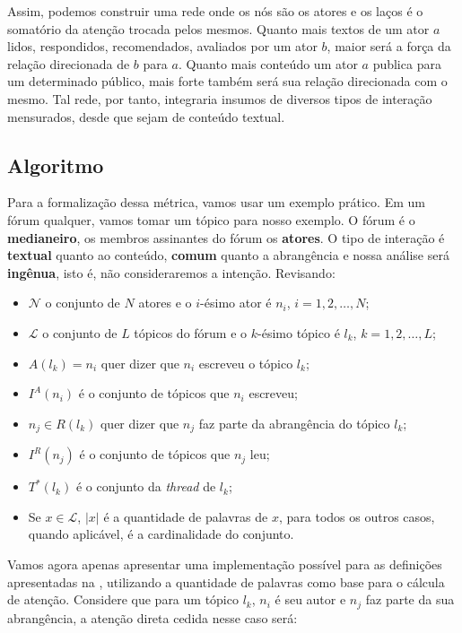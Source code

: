 Assim, podemos construir uma rede onde os nós são os atores e os laços é o
somatório da atenção trocada pelos mesmos. Quanto mais textos de um ator $a$
lidos, respondidos, recomendados, avaliados por um ator $b$, maior será a força
da relação direcionada de $b$ para $a$. Quanto mais conteúdo um ator $a$ publica
para um determinado público, mais forte também será sua relação direcionada
com o mesmo. Tal rede, por tanto, integraria insumos de diversos tipos de
interação mensurados, desde que sejam de conteúdo textual.

\subsection{Algoritmo}
\label{sec:formalizacao}
Para a formalização dessa métrica, vamos usar um exemplo prático. Em um fórum
qualquer, vamos tomar um tópico para nosso exemplo. O fórum é o
\textbf{medianeiro}, os membros assinantes do fórum os \textbf{atores}. O tipo de
interação é \textbf{textual} quanto ao conteúdo, \textbf{comum} quanto a
abrangência e nossa análise será \textbf{ingênua}, isto é, não consideraremos a
intenção. Revisando:
\begin{itemize}
  \item $\mathscr{N}$ o conjunto de $N$ atores e o $i$-ésimo ator é $n_i$,
  $i=1,2,\ldots,N$;
  \item $\mathscr{L}$ o conjunto de $L$ tópicos do fórum e o $k$-ésimo
  tópico é $l_k$, $k=1,2,\ldots,L$;
  \item $A(l_k) = n_i$ quer dizer que $n_i$ escreveu o tópico $l_k$;
  \item $I^A(n_i)$ é o conjunto de tópicos que $n_i$ escreveu;
  \item $n_j \in R(l_k)$ quer dizer que $n_j$ faz parte da abrangência do tópico
  $l_k$;
  \item $I^R(n_j)$ é o conjunto de tópicos que $n_j$ leu;
  \item $T^*(l_k)$ é o conjunto da \emph{thread} de $l_k$; 
  \item Se $x \in \mathscr{L}$, $|x|$ é a quantidade de palavras de $x$, para
  todos os outros casos, quando aplicável, é a cardinalidade do conjunto.
\end{itemize}

Vamos agora apenas apresentar uma implementação possível para as definições
apresentadas na , utilizando a quantidade de palavras
como base para o cálcula de atenção. Considere que para um tópico $l_k$, $n_i$ é
seu autor e $n_j$ faz parte da sua abrangência, a atenção direta cedida nesse
caso será:

